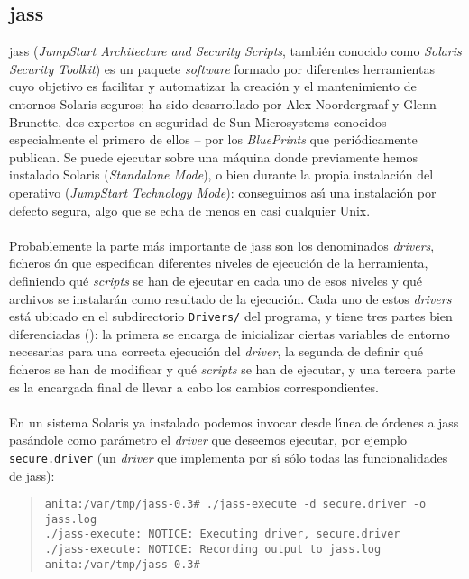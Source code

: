 \subsection{\sc jass}
{\sc jass} ({\it JumpStart Architecture and Security Scripts}, tambi\'en 
conocido como {\it Solaris Security Toolkit}) es un paquete {\it software} 
formado por diferentes herramientas cuyo objetivo es facilitar y automatizar la 
creaci\'on y el mantenimiento de entornos Solaris seguros; ha sido desarrollado
por Alex Noordergraaf y Glenn Brunette, dos expertos en seguridad de Sun 
Microsystems conocidos -- especialmente el primero de ellos -- por los {\it 
BluePrints} que peri\'odicamente publican. Se puede ejecutar sobre
una m\'aquina donde previamente hemos instalado Solaris ({\it Standalone 
Mode}), o bien durante la propia instalaci\'on del operativo ({\it JumpStart
Technology Mode}): conseguimos as\'{\i} una instalaci\'on por defecto segura, 
algo que se echa de menos en casi cualquier Unix.\\
\\Probablemente la parte m\'as importante de {\sc jass} son los denominados {\it
drivers}, ficheros \'on que especifican diferentes niveles de ejecuci\'on de la 
herramienta, definiendo qu\'e {\it scripts} se han de ejecutar en cada uno 
de esos niveles y qu\'e archivos se instalar\'an como resultado de la 
ejecuci\'on. Cada uno de estos {\it drivers} est\'a ubicado en el subdirectorio
{\tt Drivers/} del programa, y tiene tres partes bien diferenciadas 
(\cite{kn:noo01}): la primera
se encarga de inicializar ciertas variables de entorno necesarias para una 
correcta ejecuci\'on del {\it driver}, la segunda de definir qu\'e ficheros se
han de modificar y qu\'e {\it scripts} se han de ejecutar, y una tercera parte
es la encargada final de llevar a cabo los cambios correspondientes.\\
\\En un sistema Solaris ya instalado podemos invocar desde l\'{\i}nea de 
\'ordenes a {\sc jass} pas\'andole como par\'ametro el {\it driver} que deseemos
ejecutar, por ejemplo {\tt secure.driver} (un {\it driver} que implementa por
s\'{\i} s\'olo todas las funcionalidades de {\sc jass}):
\begin{quote}
\begin{verbatim}
anita:/var/tmp/jass-0.3# ./jass-execute -d secure.driver -o jass.log
./jass-execute: NOTICE: Executing driver, secure.driver
./jass-execute: NOTICE: Recording output to jass.log
anita:/var/tmp/jass-0.3# 
\end{verbatim}
\end{quote}
